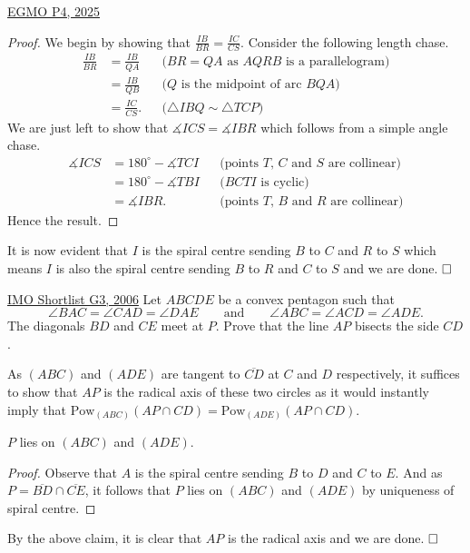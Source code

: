 \begin{problem}{7}{\href{https://artofproblemsolving.com/community/q2h3548106p35507758}{EGMO P4, 2025}}
\begin{solution}
	\begin{proof} We begin by showing that $\frac{IB}{BR}=\frac{IC}{CS}$. Consider the following length chase.
\begin{align*} \frac{IB}{BR}&=\frac{IB}{QA} && \text{($BR=QA$ as $AQRB$ is a parallelogram)}\\ &=\frac{IB}{QB} && \text{($Q$ is the midpoint of arc $BQA$)}\\ &=\frac{IC}{CS}.&& \text{($\triangle IBQ\sim \triangle TCP$)} \end{align*}We are just left to show that $\measuredangle ICS=\measuredangle IBR$ which follows from a simple angle chase.
\begin{align*} \measuredangle ICS&=180^{\circ}-\measuredangle TCI &&\text{(points $T$, $C$ and $S$ are collinear)}\\ &=180^{\circ}-\measuredangle TBI && \text{($BCTI$ is cyclic)}\\ &=\measuredangle IBR. && \text{(points $T$, $B$ and $R$ are collinear)} \end{align*}Hence the result.
	\end{proof}

	It is now evident that $I$ is the spiral centre sending $B$ to $C$ and $R$ to $S$ which means $I$ is also the spiral centre sending $B$ to $R$ and $C$ to $S$ and we are done. $\qedwhite$
	\end{solution}
\end{problem}

\begin{problem}{8}{\href{https://artofproblemsolving.com/community/q2h130813p35493023}{IMO Shortlist G3, 2006}} 
	Let $ ABCDE$ be a convex pentagon such that
\[ \angle BAC = \angle CAD = \angle DAE\qquad \text{and}\qquad \angle ABC = \angle ACD = \angle ADE. \]The diagonals $BD$ and $CE$ meet at $P$. Prove that the line $AP$ bisects the side $CD$.
	\begin{solution} As $(ABC)$ and $(ADE)$ are tangent to $\overline{CD}$ at $C$ and $D$ respectively, it suffices to show that $AP$ is the radical axis of these two circles as it would instantly imply that $\text{Pow}_{(ABC)}(AP\cap CD)=\text{Pow}_{(ADE)}(AP\cap CD)$.

	\begin{numclaim}{1} $P$ lies on $(ABC)$ and $(ADE)$.
	\end{numclaim}
	\begin{proof} Observe that $A$ is the spiral centre sending $B$ to $D$ and $C$ to $E$. And as $P=\overline{BD}\cap \overline{CE}$, it follows that $P$ lies on $(ABC)$ and $(ADE)$ by uniqueness of spiral centre.
	\end{proof}

	By the above claim, it is clear that $AP$ is the radical axis and we are done. $\qedwhite$
	\end{solution}
\end{problem}

